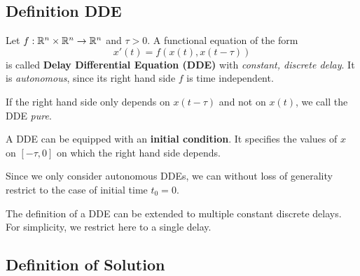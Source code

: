 

\subsection{Definition DDE} \label{sec:definition-dde}

\begin{definition}
    \label{definition-dde}

    Let $f:\mathbb{R}^n\times\mathbb{R}^n\rightarrow\mathbb{R}^n$ and $\tau > 0$.
    A functional equation of the form
    \begin{equation}
        x'(t) = f\left(x(t),x(t-\tau)\right)
    \end{equation}
    is called \textbf{Delay Differential Equation (DDE)} with \emph{constant, discrete delay}. It is \emph{autonomous}, since its right hand side $f$ is time independent.

    If the right hand side only depends on $x(t-\tau)$ and not on $x(t)$, we call the DDE \emph{pure}.

    A DDE can be equipped with an \textbf{initial condition}. It specifies the values of $x$ on $[-\tau, 0]$ on which the right hand side depends.

\end{definition}

Since we only consider autonomous DDEs, we can without loss of generality restrict to the case of initial time $t_0=0$.

The definition of a DDE can be extended to multiple constant discrete delays. For simplicity, we restrict here to a single delay.

\subsection{Definition of Solution} \label{sec:definition-of-solution}

